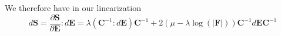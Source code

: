 We therefore have in our linearization
\begin{equation}
d \boldsymbol{S} = \frac{\partial \boldsymbol{S}}{\partial \boldsymbol{E}} : d \boldsymbol{E} = \lambda (\boldsymbol{C}^{-1} : d \boldsymbol{E}) \boldsymbol{C}^{-1} + 2 (\mu - \lambda \log \left( \lvert \boldsymbol{F} \rvert \right)) \boldsymbol{C}^{-1} d \boldsymbol{E} \boldsymbol{C}^{-1}
\label{dconstitutive}
\end{equation}

